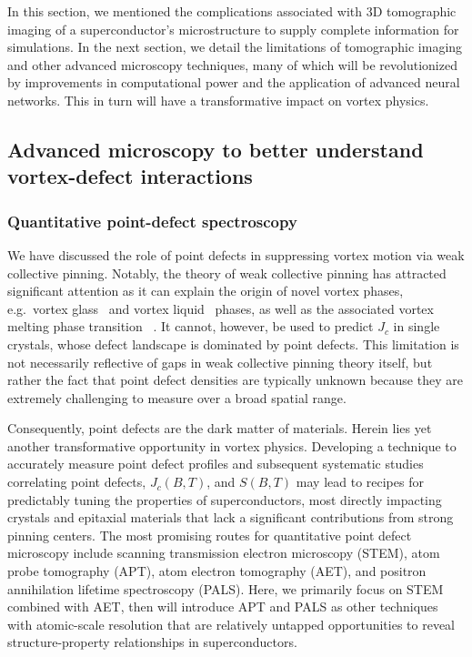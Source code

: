 \documentclass[%
 aip,
 amsmath,amssymb,
 reprint,%
floatfix]{revtex4-1}
\newcommand{\Jc}{J_{c}}
\begin{document}
In this section, we mentioned the complications associated with 3D tomographic imaging of a superconductor's microstructure to supply complete information for simulations. In the next section, we detail the limitations of tomographic imaging and other advanced microscopy techniques, many of which will be revolutionized by improvements in computational power and the application of advanced neural networks.  This in turn will have a transformative impact on vortex physics.



\subsection{Advanced microscopy to better understand vortex-defect interactions\label{ssec:microscopy}}
\subsubsection{Quantitative point-defect spectroscopy }

We have discussed the role of point defects in suppressing vortex motion via weak collective pinning.  Notably, the theory of weak collective pinning\cite{Larkin1979} has attracted significant attention as it can explain the origin of novel vortex phases, e.g.\ vortex glass~\cite{Fisher1989,Fisher1991} and vortex liquid~\cite{Nelson1988} phases, as well as the associated vortex melting phase transition ~\cite{Brandt1989, Houghton1989}.  It cannot, however, be used to predict $\Jc$ in single crystals, whose defect landscape is dominated by point defects.  This limitation is not necessarily reflective of gaps in weak collective pinning theory itself, but rather the fact that point defect densities are typically unknown because they are extremely challenging to measure over a broad spatial range. 

Consequently, point defects are the dark matter of materials. Herein lies yet another transformative opportunity in vortex physics.  Developing a technique to accurately measure point defect profiles and subsequent systematic studies correlating point defects, $\Jc(B,T)$, and $S(B,T)$ may lead to recipes for predictably tuning the properties of superconductors, most directly impacting crystals and epitaxial materials that lack a significant contributions from strong pinning centers. The most promising routes for quantitative point defect microscopy include scanning transmission electron microscopy (STEM), atom probe tomography (APT), atom electron tomography (AET), and positron annihilation lifetime spectroscopy (PALS). Here, we primarily focus on STEM combined with AET, then will introduce APT and PALS as other techniques with atomic-scale resolution that are relatively untapped opportunities to reveal structure-property relationships in superconductors.
\end{document}

